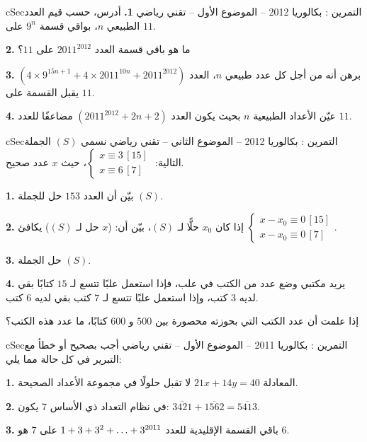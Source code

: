 \documentclass[12pt,a4paper]{article}
\newenvironment{BOX}[2]{\begin{otherlanguage}{english}\begin{arbox}{#1}{#2}}{\end{arbox}\end{otherlanguage}}
\newcounter{exo}
\newenvironment{tamrin}[1]{\stepcounter{exo}\begin{BOX}{cSec}{التمرين \theexo: #1}}{\end{BOX}}
\renewcommand{\dots}{\mathinner{\ldotp\ldotp\ldotp}}
\begin{document}
\begin{tamrin}{بكالوريا 2012 -- الموضوع الأول -- تقني رياضي}
\textbf{1.} أدرس، حسب قيم العدد الطبيعي $n$، بواقي قسمة $9^n$ على $11$.

\textbf{2.} ما هو باقي قسمة العدد $2011^{2012}$ على $11$؟

\textbf{3.} برهن أنه من أجل كل عدد طبيعي $n$، العدد $\left(4\times9^{15n+1}+4\times2011^{10n}+2011^{2012}\right)$ يقبل القسمة على $11$.

\textbf{4.} عيّن الأعداد الطبيعية $n$ بحيث يكون العدد $\left(2011^{2012}+2n+2\right)$ مضاعفًا للعدد $11$.
\end{tamrin}

\begin{tamrin}{بكالوريا 2012 -- الموضوع الثاني -- تقني رياضي}
نسمي $(S)$ الجملة التالية: $\begin{cases}x\equiv3\,[15]\\ x\equiv6\,[7]\end{cases}$، حيث $x$ عدد صحيح.

\textbf{1.} بيّن أن العدد $153$ حل للجملة $(S)$.

\textbf{2.} إذا كان $x_0$ حلًّا لـ $(S)$، بيّن أن: ($x$ حل لـ $(S)$) يكافئ $\begin{cases}x-x_0\equiv0\,[15]\\ x-x_0\equiv0\,[7]\end{cases}$.

\textbf{3.} حل الجملة $(S)$.

\textbf{4.} يريد مكتبي وضع عدد من الكتب في علب، فإذا استعمل علبًا تتسع لـ $15$ كتابًا بقي لديه $3$ كتب، وإذا استعمل علبًا تتسع لـ $7$ كتب بقي لديه $6$ كتب.

إذا علمت أن عدد الكتب التي بحوزته محصورة بين $500$ و $600$ كتابًا، ما عدد هذه الكتب؟
\end{tamrin}

\begin{tamrin}{بكالوريا 2011 -- الموضوع الأول -- تقني رياضي}
أجب بصحيح أو خطأ مع التبرير في كل حالة مما يلي:

\textbf{1.} المعادلة $21x+14y=40$ لا تقبل حلولًا في مجموعة الأعداد الصحيحة.

\textbf{2.} في نظام التعداد ذي الأساس $7$ يكون: $\overline{3421}+\overline{1562}=\overline{5413}$.

\textbf{3.} باقي القسمة الإقليدية للعدد $1+3+3^2+\dots+3^{2011}$ على $7$ هو $6$.
\end{tamrin}
\end{document}
